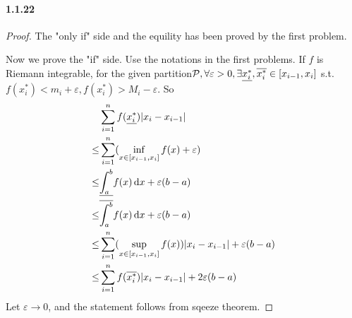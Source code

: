 \documentclass{article}
\begin{document}
\paragraph{1.1.22}
\begin{proof}
The "only if" side and the equility has been proved by the first problem.

Now we prove the "if" side. Use the notations in the first problems. If $f$ is Riemann integrable, for the given partition$\mathcal{P},\forall \varepsilon>0, \exists \uline{x^*_i},\overline{x^*_i}\in[x_{i-1},x_i]$ s.t. $f(x^*_i)<m_i+\varepsilon,f(x^*_i)>M_i-\varepsilon$. So
\begin{align*}
&\sum_{i=1}^{n}f(\uline{x_i^*})|x_i-x_{i-1}|\\
\leq&\sum_{i=1}^{n} (\inf_{x\in [x_{i-1},x_i]}f(x)+\varepsilon)\\
\leq&\uline{\int_a^b} f(x)\dd x +\varepsilon (b-a)\\
\leq&\overline{\int_a^b} f(x) \dd x +\varepsilon (b-a)\\
\leq&\sum_{i=1}^n (\sup_{x\in [x_{i-1},x_i]}f(x))|x_i-x_{i-1}|+\varepsilon (b-a)\\
\leq&\sum_{i=1}^n f(\overline{x^*_i})|x_i-x_{i-1}|+2\varepsilon (b-a)
\end{align*}
Let $\varepsilon\to 0$, and the statement follows from sqeeze theorem.
\end{proof}
\end{document}
